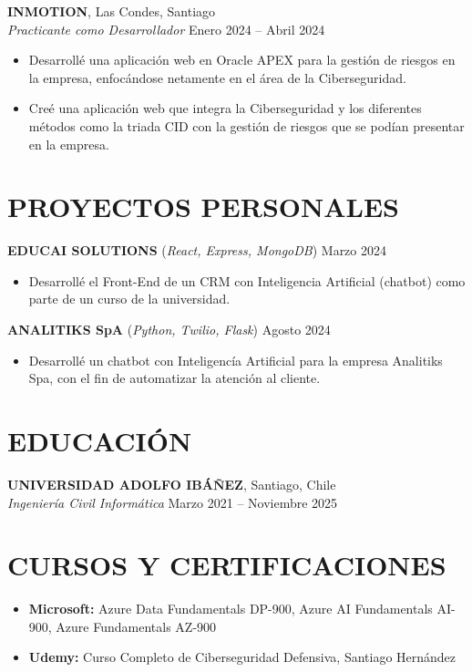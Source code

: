 \documentclass[a4paper,10pt]{article}
\begin{document}
\textbf{INMOTION}, Las Condes, Santiago \\
\textit{Practicante como Desarrollador} \hfill Enero 2024 – Abril 2024
\begin{itemize}[noitemsep]
    \item Desarrollé una aplicación web en Oracle APEX para la gestión de riesgos en la empresa, enfocándose netamente en el área de la Ciberseguridad.
    \item Creé una aplicación web que integra la Ciberseguridad y los diferentes métodos como la triada CID con la gestión de riesgos que se podían presentar en la empresa.
\end{itemize}

\section*{PROYECTOS PERSONALES}
\textbf{EDUCAI SOLUTIONS} (\textit{React, Express, MongoDB}) \hfill Marzo 2024
\begin{itemize}[noitemsep]
    \item Desarrollé el Front-End de un CRM con Inteligencia Artificial (chatbot) como parte de un curso de la universidad.
\end{itemize}
\textbf{ANALITIKS SpA} (\textit{Python, Twilio, Flask}) \hfill Agosto 2024
\begin{itemize}[noitemsep]
    \item Desarrollé un chatbot con Inteligencía Artificial para la empresa Analitiks Spa, con el fin de automatizar la atención al cliente.
\end{itemize}

\section*{EDUCACIÓN}
\textbf{UNIVERSIDAD ADOLFO IBÁÑEZ}, Santiago, Chile \\
\textit{Ingeniería Civil Informática} \hfill Marzo 2021 – Noviembre 2025

\section*{CURSOS Y CERTIFICACIONES}
\begin{itemize}[noitemsep]
    \item \textbf{Microsoft:} Azure Data Fundamentals DP-900, Azure AI Fundamentals AI-900, Azure Fundamentals AZ-900
    \item \textbf{Udemy:} Curso Completo de Ciberseguridad Defensiva, Santiago Hernández
\end{itemize}
\end{document}
